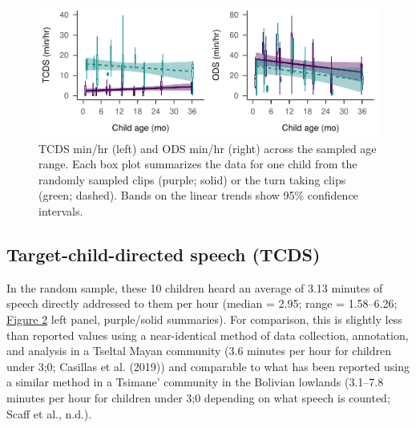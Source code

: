 \documentclass[
  english,
  ,man,floatsintext]{apa6}
\begin{document}
\begin{figure}
\centering
\includegraphics{Yeli-CLE_files/figure-latex/fig2-1.pdf}
\caption{\label{fig:fig2}TCDS min/hr (left) and ODS min/hr (right) across the sampled age range. Each box plot summarizes the data for one child from the randomly sampled clips (purple; solid) or the turn taking clips (green; dashed). Bands on the linear trends show 95\% confidence intervals.}
\end{figure}

\hypertarget{target-child-directed-speech-tcds}{%
\subsection{Target-child-directed speech (TCDS)}\label{target-child-directed-speech-tcds}}

In the random sample, these 10 children heard an average of 3.13 minutes of speech directly addressed to them per hour (median = 2.95; range = 1.58--6.26; \protect\hyperlink{fig2}{Figure 2} left panel, purple/solid summaries). For comparison, this is slightly less than reported values using a near-identical method of data collection, annotation, and analysis in a Tseltal Mayan community (3.6 minutes per hour for children under 3;0; Casillas et al. (2019)) and comparable to what has been reported using a similar method in a Tsimane' community in the Bolivian lowlands (3.1--7.8 minutes per hour for children under 3;0 depending on what speech is counted; Scaff et al., n.d.).
\end{document}
